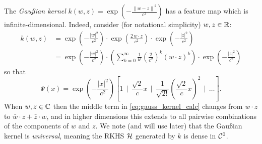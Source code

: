 \begin{example}
    The \emph{Gaußian kernel} 
    $k(w, z) = \exp \left( -\frac{\left\| w - z \right\|^2}{c^2} \right)$ has a feature 
    map which is infinite-dimensional. Indeed, consider (for notational simplicity) 
    $w, z \in \mathbb{R}$: 
    \begin{equation}
        \label{eq:gauss_kernel_calc}
        \begin{split}
            k(w, z) &= 
            \exp \left( -\frac{| w |^2}{c^2} \right) \cdot
            \exp \left( \frac{2\, w \cdot z}{c^2} \right) \cdot
            \exp \left( -\frac{| z |^2}{c^2} \right) \\
            &= \exp \left( -\frac{| w |^2}{c^2} \right) \cdot
            \left( \sum_{k=0}^{\infty} \frac{1}{k!} \left( \frac{2}{c^2} \right)^k (w \cdot z)^k \right)
            \cdot \exp \left( -\frac{| z |^2}{c^2} \right)
        \end{split}
    \end{equation}
    so that 
    \begin{equation}
        \Psi (x) = 
        \exp \left( -\frac{| x |^2}{c^2} \right)
        \left[ 
            1 \ \ \Bigg|\ \ 
            \frac{\sqrt{2}}{c} x \ \ \Bigg|\ \ 
            \frac{1}{\sqrt{2 !}} \left( \frac{\sqrt{2}}{c} x \right)^2 \ \ \Bigg|\ \ 
            \ldots 
        \right] . 
    \end{equation}
    When $w, z \in \mathbb{C}$ then the middle term in \ref{eq:gauss_kernel_calc} changes from 
    $w \cdot z$ to $\bar{w} \cdot z + \bar{z} \cdot w$, and in higher dimensions this 
    extends to all pairwise combinations of the components of $w$ and $z$. We note 
    (and will use later) that the Gaußian kernel is \emph{universal}, meaning the RKHS 
    $\mathcal{H}$ generated by $k$ is dense in $\mathcal{C}^0$. 
\end{example}

